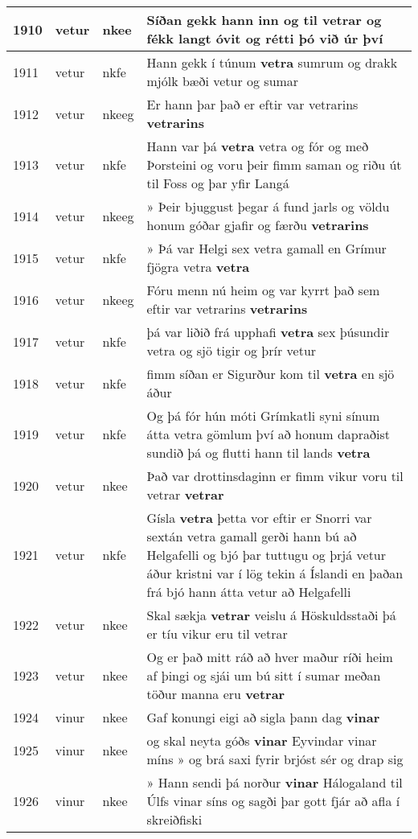 \documentclass{article}
\begin{document}
\begin{longtable}{p{1cm}|p{1cm}|p{1cm}|p{13cm}}
1910&vetur&nkee&Síðan gekk hann inn og til \textbf{vetrar} og fékk langt óvit og rétti þó við úr því\\
\hline
1911&vetur&nkfe&Hann gekk í túnum \textbf{vetra} sumrum og drakk mjólk bæði vetur og sumar\\
\hline
1912&vetur&nkeeg&Er hann þar það er eftir var vetrarins \textbf{vetrarins} \\
\hline
1913&vetur&nkfe&Hann var þá \textbf{vetra} vetra og fór og með Þorsteini og voru þeir fimm saman og riðu út til Foss og þar yfir Langá\\
\hline
1914&vetur&nkeeg&» Þeir bjuggust þegar á fund jarls og völdu honum góðar gjafir og færðu \textbf{vetrarins} \\
\hline
1915&vetur&nkfe&» Þá var Helgi sex vetra gamall en Grímur fjögra vetra \textbf{vetra} \\
\hline
1916&vetur&nkeeg&Fóru menn nú heim og var kyrrt það sem eftir var vetrarins \textbf{vetrarins} \\
\hline
1917&vetur&nkfe&þá var liðið frá upphafi \textbf{vetra} sex þúsundir vetra og sjö tigir og þrír vetur\\
\hline
1918&vetur&nkfe&fimm síðan er Sigurður kom til \textbf{vetra} en sjö áður\\
\hline
1919&vetur&nkfe&Og þá fór hún móti Grímkatli syni sínum átta vetra gömlum því að honum dapraðist sundið þá og flutti hann til lands \textbf{vetra} \\
\hline
1920&vetur&nkee&Það var drottinsdaginn er fimm vikur voru til vetrar \textbf{vetrar} \\
\hline
1921&vetur&nkfe&Gísla \textbf{vetra} þetta vor eftir er Snorri var sextán vetra gamall gerði hann bú að Helgafelli og bjó þar tuttugu og þrjá vetur áður kristni var í lög tekin á Íslandi en þaðan frá bjó hann átta vetur að Helgafelli\\
\hline
1922&vetur&nkee&Skal sækja \textbf{vetrar} veislu á Höskuldsstaði þá er tíu vikur eru til vetrar\\
\hline
1923&vetur&nkee&Og er það mitt ráð að hver maður ríði heim af þingi og sjái um bú sitt í sumar meðan töður manna eru \textbf{vetrar} \\
\hline
1924&vinur&nkee&Gaf konungi eigi að sigla þann dag \textbf{vinar} \\
\hline
1925&vinur&nkee&og skal neyta góðs \textbf{vinar} Eyvindar vinar míns » og brá saxi fyrir brjóst sér og drap sig\\
\hline
1926&vinur&nkee&» Hann sendi þá norður \textbf{vinar} Hálogaland til Úlfs vinar síns og sagði þar gott fjár að afla í skreiðfiski\\

\end{longtable}
\end{document}
